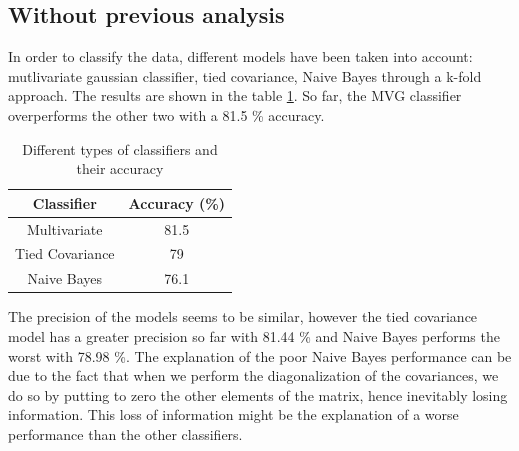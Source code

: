 \documentclass[twoside,a4paper,12pt]{report}
\begin{document}
\subsection{Without previous analysis}

In order to classify the data, different models have been taken into account:
mutlivariate gaussian classifier, tied covariance, Naive Bayes through a k-fold approach.
 The results are shown in the table \ref{diffTypesclass}. So far, the MVG classifier
 overperforms the other two with a 81.5 \% accuracy.
\begin{table}
\centering
 \begin{tabular}{||c c||} 
    \hline \hline
    Classifier & Accuracy (\%) \\
    \hline\hline
    Multivariate & 81.5  \\ 
    \hline
    Tied Covariance & 79 \\
    \hline
    Naive Bayes & 76.1 \\
    \hline \hline
\end{tabular}
\label{diffTypesclass}
\caption{Different types of classifiers and their accuracy}
\end{table}

The precision of the models seems to be similar, however the tied covariance model has a
 greater precision so far with 81.44 \% and Naive Bayes performs the worst with 78.98 \%. 
 The explanation of the poor Naive Bayes performance can be due to the fact that when we 
 perform the diagonalization of the covariances, we do so by putting to zero the other elements
  of the matrix, hence inevitably losing information. This loss of information might be the 
  explanation of a worse performance than the other classifiers.  
\end{document}
